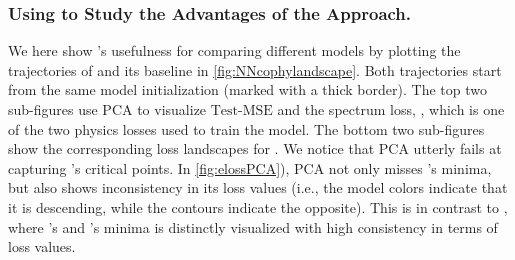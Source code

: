 \documentclass[letterpaper]{article} %
\begin{document}
          \subsubsection{Using \proposedautencoder{} to Study the Advantages of the \cophy{} Approach.} 
          We here show \proposedautencoder{}'s usefulness for comparing different models by plotting the trajectories of \cophy{} and its baseline \nn{} in \cref{fig:NNcophylandscape}. Both trajectories start from the same model initialization (marked with a thick border). The top two sub-figures use PCA to visualize $\text{Test-MSE}$ and the spectrum loss, \eloss{}, which is one of the two physics losses used to train the model. 
          The bottom two sub-figures show the corresponding loss landscapes for \proposedautencoder{}. We notice that %
          PCA utterly fails at capturing \nn{}'s critical points. In \cref{fig:elossPCA}), 
          PCA not only misses \nn{}'s minima, but also shows inconsistency in its loss values (i.e., the model colors indicate that it is descending, while the contours indicate the opposite). This is in contrast to \proposedautencoder{}, where \nn{}'s and \cophy{}'s minima is distinctly visualized with high consistency in terms of loss values. %
\end{document}
